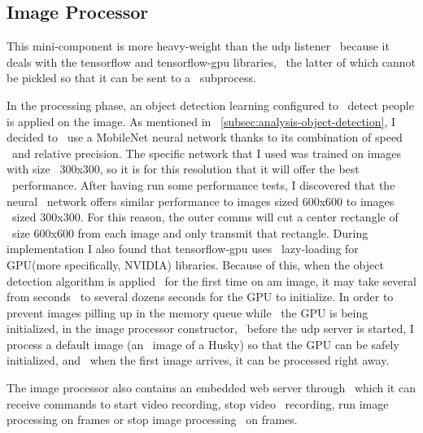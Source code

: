 \subsection{Image Processor}
\label{subsec:implementation-image-processor}
This mini-component is more heavy-weight than the udp listener \
because it deals with the tensorflow and tensorflow-gpu libraries, \
the latter of which cannot be pickled so that it can be sent to a \
subprocess.

In the processing phase, an object detection learning configured to \
detect people is applied on the image.
As mentioned in ~\ref{subsec:analysis-object-detection}, I decided to \
use a MobileNet neural network thanks to its combination of speed \
and relative precision.
The specific network that I used was trained on images with size \
300x300, so it is for this resolution that it will offer the best \
performance.
After having run some performance tests, I discovered that the neural \
network offers similar performance to images sized 600x600 to images \
sized 300x300.
For this reason, the outer comms will cut a center rectangle of \
size 600x600 from each image and only transmit that rectangle. %
During implementation I also found that tensorflow-gpu uses \
lazy-loading for GPU(more specifically, NVIDIA) libraries.
Because of this, when the object detection algorithm is applied \
for the first time on am image, it may take several from seconds \
to several dozens seconds for the GPU to initialize.
In order to prevent images pilling up in the memory queue while \
the GPU is being initialized, in the image processor constructor, \
before the udp server is started, I process a default image (an \
image of a Husky) so that the GPU can be safely initialized, and \
when the first image arrives, it can be processed right away.


 The image processor also contains an embedded web server through \
which it can receive commands to start video recording, stop video \
recording, run image processing on frames or stop image processing \
on frames.

